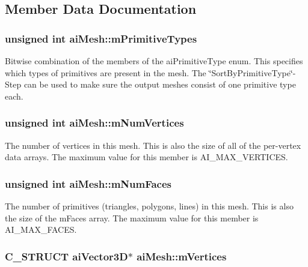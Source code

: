 \subsection{Member Data Documentation}
\hypertarget{structai_mesh_99d66ac0a444068c1b252b30265cbf53}{
\subsubsection[mPrimitiveTypes]{\setlength{\rightskip}{0pt plus 5cm}unsigned int {\bf aiMesh::mPrimitiveTypes}}}
\label{structai_mesh_99d66ac0a444068c1b252b30265cbf53}


Bitwise combination of the members of the aiPrimitiveType enum. This specifies which types of primitives are present in the mesh. The \char`\"{}SortByPrimitiveType\char`\"{}-Step can be used to make sure the output meshes consist of one primitive type each. \hypertarget{structai_mesh_b34b7b5941e6636f1c08f615cbb072ef}{
\subsubsection[mNumVertices]{\setlength{\rightskip}{0pt plus 5cm}unsigned int {\bf aiMesh::mNumVertices}}}
\label{structai_mesh_b34b7b5941e6636f1c08f615cbb072ef}


The number of vertices in this mesh. This is also the size of all of the per-vertex data arrays. The maximum value for this member is AI\_\-MAX\_\-VERTICES. \hypertarget{structai_mesh_eed22ee6963b79548f3877b3c905518e}{
\subsubsection[mNumFaces]{\setlength{\rightskip}{0pt plus 5cm}unsigned int {\bf aiMesh::mNumFaces}}}
\label{structai_mesh_eed22ee6963b79548f3877b3c905518e}


The number of primitives (triangles, polygons, lines) in this mesh. This is also the size of the mFaces array. The maximum value for this member is AI\_\-MAX\_\-FACES. \hypertarget{structai_mesh_fd4588abb3e1c72821ae0234a3850662}{
\subsubsection[mVertices]{\setlength{\rightskip}{0pt plus 5cm}C\_\-STRUCT aiVector3D$\ast$ {\bf aiMesh::mVertices}}}
\label{structai_mesh_fd4588abb3e1c72821ae0234a3850662}


